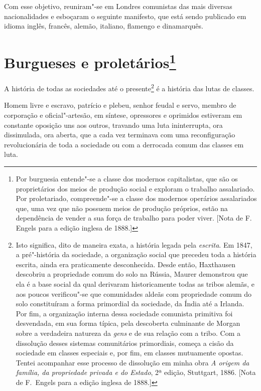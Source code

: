 Com esse objetivo, reuniram"-se em Londres comunistas das mais diversas	
nacionalidades e esboçaram o seguinte manifesto, que está sendo
publicado em idioma inglês, francês, alemão, italiano, flamengo e
dinamarquês.

\section{Burgueses e proletários\protect\footnote{\MakeUppercase{P}or
burguesia entende"-se a classe dos modernos capitalistas, que são os
proprietários dos meios de produção social e exploram o trabalho
assalariado. \MakeUppercase{P}or proletariado, compreende"-se a classe dos modernos
operários assalariados que, uma vez que não possuem meios de produção
próprios, estão na dependência de vender a sua força de trabalho para
poder viver. [\MakeUppercase{N}ota de \MakeUppercase{F.\,E}ngels para a edição inglesa de 1888.]}}

A história de todas as sociedades até o
presente\footnote{ Isto significa, dito de maneira exata, a história legada
pela \textit{escrita}. Em 1847, a pré"-história da sociedade, a organização
social que precedeu toda a história escrita, ainda era praticamente
desconhecida. Desde então, Haxthausen descobriu a propriedade comum do
solo na Rússia, Maurer demonstrou que ela é a base social da qual
derivaram historicamente todas as tribos alemãs, e aos poucos
verificou"-se que comunidades aldeãs com propriedade comum do solo
constituíram a forma primordial da sociedade, da Índia até a Irlanda.
Por fim, a organização interna dessa sociedade comunista primitiva foi
desvendada, em sua forma típica, pela descoberta culminante de Morgan
sobre a verdadeira natureza da \textit{gens} e de sua relação com a
tribo. Com a dissolução desses sistemas comunitários primordiais,
começa a cisão da sociedade em classes especiais e, por fim, em classes
mutuamente opostas. Tentei acompanhar esse processo de dissolução em
minha obra \textit{A origem da família, da propriedade privada e do
Estado}, 2ª edição, Stuttgart, 1886. [Nota de F.~Engels para a edição
inglesa de 1888.]} é a história das lutas de classes.

Homem livre e escravo, patrício e plebeu, senhor feudal e servo, membro
de corporação e oficial"-artesão, em síntese, opressores e oprimidos
estiveram em constante oposição uns aos outros, travando uma luta
ininterrupta, ora dissimulada, ora aberta, que a cada vez terminava com
uma reconfiguração revolucionária de toda a sociedade ou com a
derrocada comum das classes em luta.

